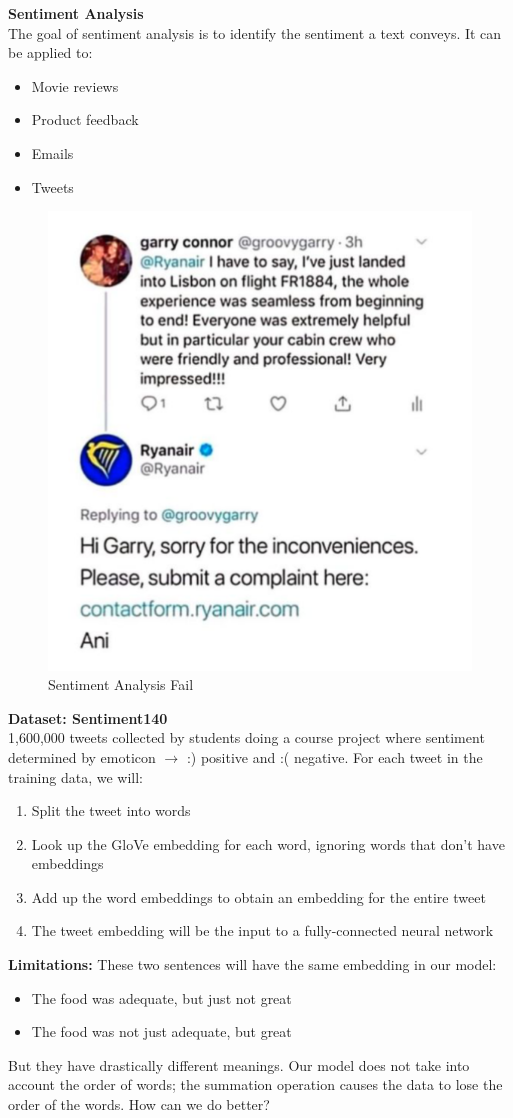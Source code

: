 \noindent\textbf{Sentiment Analysis}\\

The goal of sentiment analysis is to identify the sentiment a text conveys. It can be applied to:
\begin{itemize}
    \item Movie reviews
    \item Product feedback
    \item Emails
    \item Tweets

\end{itemize}

\begin{figure}[h!t]
    \centering
    \includegraphics[width=0.5\linewidth]{failingsentimentanalysis.png}
    \caption{Sentiment Analysis Fail}
    \label{fig:enter-label}
\end{figure}

\noindent\textbf{Dataset: Sentiment140}\\

1,600,000 tweets collected by students doing a course project where sentiment determined by emoticon $\rightarrow$ :) positive and :( negative. For each tweet in the training data, we will:
\begin{enumerate}
    \item Split the tweet into words
    \item Look up the GloVe embedding for each word, ignoring words that don't have embeddings
    \item Add up the word embeddings to obtain an embedding for the entire tweet
    \item The tweet embedding will be the input to a fully-connected neural network
\end{enumerate}

\textbf{Limitations:} These two sentences will have the same embedding in our model:
\begin{itemize}
    \item The food was adequate, but just not great
    \item The food was not just adequate, but great
\end{itemize}
But they have drastically different meanings. Our model does not take into account the order of words; the summation operation causes the data to lose the order of the words. How can we do better?\\


